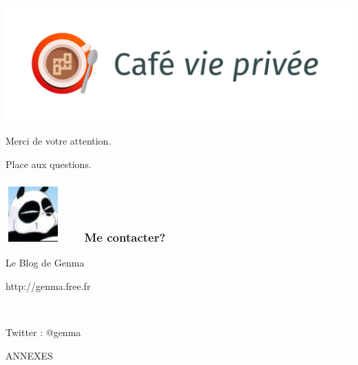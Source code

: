 \documentclass{beamer}
\begin{document}
\begin{frame}
\begin{center}
\includegraphics[scale=0.4] {./images/LogoCafeViePrivee.jpg}
\end{center}
\end{frame}

\begin{frame}
\Huge{\centerline{Merci de votre attention.}}
\Huge{\centerline{Place aux questions.}}
\end{frame}

\begin{frame}
\frametitle{\includegraphics[scale=0.4]{./images/Genma.jpg} \ \ \  Me contacter?}
\Huge{\centerline{Le Blog de Genma}}
\Huge{\centerline{http://genma.free.fr}}
\Huge{\centerline{~}}
\Huge{\centerline{Twitter : @genma}}
\end{frame}

\begin{frame}
\Huge{\centerline{ANNEXES}}
\end{frame}
\end{document}
